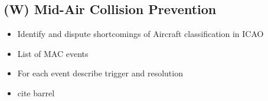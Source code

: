 \subsection{(W) Mid-Air Collision Prevention}\label{sec:MidairCollisionPrevention}
\begin{itemize}
    \item Identify and dispute shortcomings of Aircraft classification in ICAO
    \item List of MAC events
    \item For each event describe trigger and resolution 
    \item cite barrel \cite{welzl1991smallest}
\end{itemize}
